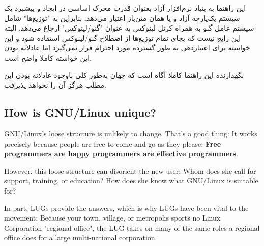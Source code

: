 \begin{note}
این راهنما به بنیاد نرم‌افزار آزاد
بعنوان قدرت محرک اساسی در ایجاد و پیشبرد یک سیستم یک‌پارچه آزاد و یا همان متن‌باز اعتبار می‌دهد. بنابراین به "توزیع‌ها" شامل سیستم عامل گنو به همراه کرنل لینوکس به عنوان "گنو/لینوکس" ارجاع می‌دهد. البته این رایج نیست که بجای تمام توزیع‌ها از اصطلاح گنو/لینوکس استفاده شود و این خواسته
برای اعتباردهی به طور گسترده مورد احترام قرار نمی‌گیرد اما عادلانه بودن این خواسته کاملا واضح است.
\end{note}


\begin{note}
نگهدارنده این راهنما کاملا آگاه است که جهان به‌طور کلی باوجود عادلانه بودن این مطلب هرگز آن را نخواهد پذیرفت.
\end{note}

\subsection{How is GNU/Linux unique?}

GNU/Linux's loose structure is unlikely to change.  That's a good thing:
It works precisely because people are free to come and go as they
please: {\bfseries Free programmers are happy programmers are effective
programmers}.

However, this loose structure can disorient the new user: Whom
does she call for support, training, or education? How does she know
what GNU/Linux is suitable for?

In part, LUGs provide the answers, which is why LUGs have been vital to
the movement: Because your town, village, or metropolis sports no
Linux Corporation "regional office", the LUG takes on many of the same
roles a regional office does for a large multi-national corporation.

